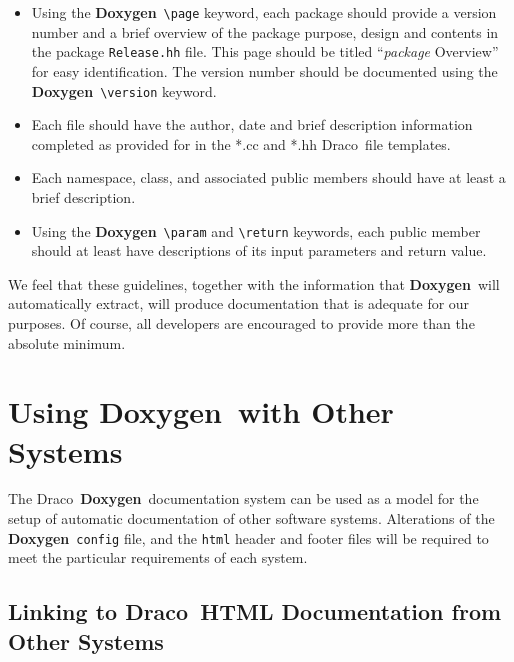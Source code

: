 \documentclass[11pt]{ResearchNote}
\newcommand{\draco}{{\normalfont\sffamily Draco}}
\newcommand{\doxy}{{\normalfont\bfseries Doxygen}}
\begin{document}
\begin{itemize}
 \item Using the \doxy\
  \verb+\page+ keyword, each package should provide a version number and
  a brief overview of the package purpose, design and contents in the package
  \texttt{Release.hh} file. This page should be titled ``{\em package} Overview''
  for easy identification. The version number should be documented using
  the \doxy\ \verb+\version+ keyword.
 \item Each file should have the author, date and brief description
  information completed as provided for in the *.cc and *.hh \draco\ 
  file templates.
 \item Each namespace, class, and associated public members
  should have at least a brief description.
 \item Using the \doxy\ \verb+\param+ and \verb+\return+ keywords,
  each public member should at least have descriptions of its input
  parameters and return value.
\end{itemize}

We feel that these guidelines, together with the information that
\doxy\ will automatically extract, will produce documentation that is
adequate for our purposes. Of course, all developers are 
encouraged to provide more than the absolute minimum.


\section{Using \doxy\ with Other Systems}

The \draco\ \doxy\ documentation system can be used as a model for
the setup of automatic documentation of other software systems. 
Alterations of 
the \doxy\ \texttt{config} file, and
the \texttt{html} header and footer files will be required to meet
the particular requirements of each system.


\subsection{Linking to \draco\ HTML Documentation from Other Systems}
\end{document}
